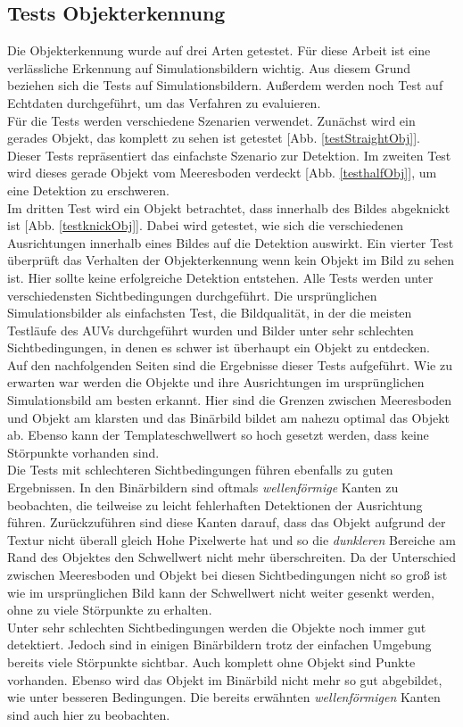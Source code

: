 \subsection{Tests Objekterkennung}
\label{sec_testObj}
Die Objekterkennung wurde auf drei Arten getestet. Für diese Arbeit ist eine verlässliche Erkennung auf Simulationsbildern wichtig. Aus diesem Grund beziehen sich die Tests auf Simulationsbildern. Außerdem werden noch Test auf Echtdaten durchgeführt, um das Verfahren zu evaluieren.\\
Für die Tests werden verschiedene Szenarien verwendet. Zunächst wird ein gerades Objekt, das komplett zu sehen ist getestet [Abb. \ref{testStraightObj}]. Dieser Tests repräsentiert das einfachste Szenario zur Detektion. Im zweiten Test wird dieses gerade Objekt vom Meeresboden verdeckt [Abb. \ref{testhalfObj}], um eine Detektion zu erschweren.\\
Im dritten Test wird ein Objekt betrachtet, dass innerhalb des Bildes abgeknickt ist [Abb. \ref{testknickObj}]. Dabei wird getestet, wie sich die verschiedenen Ausrichtungen innerhalb eines Bildes auf die Detektion auswirkt.
Ein vierter Test überprüft das Verhalten der Objekterkennung wenn kein Objekt im Bild zu sehen ist. Hier sollte keine erfolgreiche Detektion entstehen. Alle Tests werden unter verschiedensten Sichtbedingungen durchgeführt. Die ursprünglichen Simulationsbilder als einfachsten Test, die Bildqualität, in der die meisten Testläufe des AUVs durchgeführt wurden und Bilder unter sehr schlechten Sichtbedingungen, in denen es schwer ist überhaupt ein Objekt zu entdecken.\\

Auf den nachfolgenden Seiten sind die Ergebnisse dieser Tests aufgeführt. Wie zu erwarten war werden die Objekte und ihre Ausrichtungen im ursprünglichen Simulationsbild am besten erkannt. Hier sind die Grenzen zwischen Meeresboden und Objekt am klarsten und das Binärbild bildet am nahezu optimal das Objekt ab. Ebenso kann der Templateschwellwert so hoch gesetzt werden, dass keine Störpunkte vorhanden sind.\\
Die Tests mit schlechteren Sichtbedingungen führen ebenfalls zu guten Ergebnissen. In den Binärbildern sind oftmals \textit{wellenförmige} Kanten zu beobachten, die teilweise zu leicht fehlerhaften Detektionen der Ausrichtung führen. Zurückzuführen sind diese Kanten darauf, dass das Objekt aufgrund der Textur nicht überall gleich Hohe Pixelwerte hat und so die \textit{dunkleren} Bereiche am Rand des Objektes den Schwellwert nicht mehr überschreiten. Da der Unterschied zwischen Meeresboden und Objekt bei diesen Sichtbedingungen nicht so groß ist wie im ursprünglichen Bild kann der Schwellwert nicht weiter gesenkt werden, ohne zu viele Störpunkte zu erhalten.\\
Unter sehr schlechten Sichtbedingungen werden die Objekte noch immer gut detektiert. Jedoch sind in einigen Binärbildern trotz der einfachen Umgebung bereits viele Störpunkte sichtbar. Auch komplett ohne Objekt sind Punkte vorhanden. Ebenso wird das Objekt im Binärbild nicht mehr so gut abgebildet, wie unter besseren Bedingungen. Die bereits erwähnten \textit{wellenförmigen} Kanten sind auch hier zu beobachten.\\

